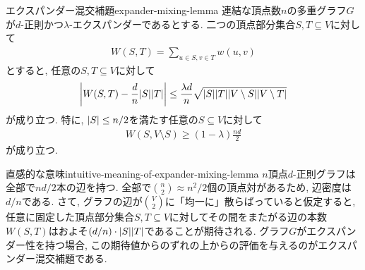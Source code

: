 \begin{lemma}{エクスパンダー混交補題}{expander-mixing-lemma}
  連結な頂点数$n$の多重グラフ$G$が$d$-正則かつ$\lambda$-エクスパンダーであるとする.
  二つの頂点部分集合$S,T\subseteq V$に対して
  \begin{align*}
    W(S,T) = \sum_{u \in S, v\in T} w(u,v)
  \end{align*}
  とすると, 任意の$S,T\subseteq V$に対して
  \begin{align*}
    \abs{ W(S,T) - \frac{d}{n}\abs{S}\abs{T} } \le \frac{\lambda d}{n} \sqrt{\abs{S}\abs{T}\abs{V\setminus S}\abs{V\setminus T}}
  \end{align*}
  が成り立つ. 特に, $\abs{S}\le n/2$を満たす任意の$S\subseteq V$に対して
  \begin{align*}
    W(S,V\setminus S) \ge (1-\lambda)\frac{nd}{2}
  \end{align*}
  が成り立つ.
\end{lemma}

\begin{remark}{直感的な意味}{intuitive-meaning-of-expander-mixing-lemma}
  $n$頂点$d$-正則グラフは全部で$nd/2$本の辺を持つ.
  全部で$\binom{n}{2}\approx n^2/2$個の頂点対があるため, 辺密度は$d/n$である.
  さて, グラフの辺が$\binom{V}{2}$に「均一に」散らばっていると仮定すると, 任意に固定した頂点部分集合$S,T\subseteq V$に対してその間をまたがる辺の本数$W(S,T)$はおよそ$(d/n)\cdot \abs{S}\abs{T}$であることが期待される.
  グラフ$G$がエクスパンダー性を持つ場合, この期待値からのずれの上からの評価を与えるのがエクスパンダー混交補題である.
\end{remark}

